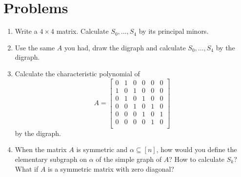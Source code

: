 \documentclass{article}
\theoremstyle{definition}
\begin{document}
\section*{Problems}
\begin{enumerate}
\setlength\itemsep{2em}
\item Write a $4\times 4$ matrix.  Calculate $S_0,\ldots, S_4$ by its principal minors.
\item Use the same $A$ you had, draw the digraph and calculate $S_0,\ldots, S_4$ by the digraph.
\item Calculate the characteristic polynomial of  
\[A = \begin{bmatrix} 
 0 & 1 & 0 & 0 & 0 & 0 \\
 1 & 0 & 1 & 0 & 0 & 0 \\
 0 & 1 & 0 & 1 & 0 & 0 \\
 0 & 0 & 1 & 0 & 1 & 0 \\
 0 & 0 & 0 & 1 & 0 & 1 \\
 0 & 0 & 0 & 0 & 1 & 0 \\
\end{bmatrix}\] 
by the digraph.
\item When the matrix $A$ is symmetric and $\alpha\subseteq[n]$, how would you define the elementary subgraph on $\alpha$ of the simple graph of $A$?  How to calculate $S_k$?  What if $A$ is a symmetric matrix with zero diagonal?
\end{enumerate}

\end{document}
